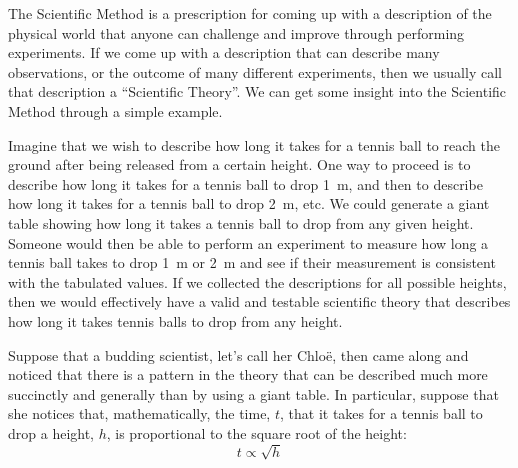 The Scientific Method is a prescription for coming up with a description of the physical world that anyone can challenge and improve through performing experiments. If we come up with a description that can describe many observations, or the outcome of many different experiments, then we usually call that description a ``Scientific Theory''. We can get some insight into the Scientific Method through a simple example. 

Imagine that we wish to describe how long it takes for a tennis ball to reach the ground after being released from a certain height. One way to proceed is to describe how long it takes for a tennis ball to drop \SI{1}{\meter}, and then to describe how long it takes for a tennis ball to drop \SI{2}{\meter}, etc. We could generate a giant table showing how long it takes a tennis ball to drop from any given height. Someone would then be able to perform an experiment to measure how long a tennis ball takes to drop \SI{1}{\meter} or \SI{2}{\meter} and see if their measurement is consistent with the tabulated values. If we collected the descriptions for all possible heights, then we would effectively have a valid and testable scientific theory that describes how long it takes tennis balls to drop from any height.

Suppose that a budding scientist, let's call her Chlo\"e, then came along and noticed that there is a pattern in the theory that can be described much more succinctly and generally than by using a giant table. In particular, suppose that she notices that, mathematically, the time, $t$, that it takes for a tennis ball to drop a height, $h$, is proportional to the square root of the height:
\begin{equation*}
t \propto \sqrt{h}
\end{equation*}


